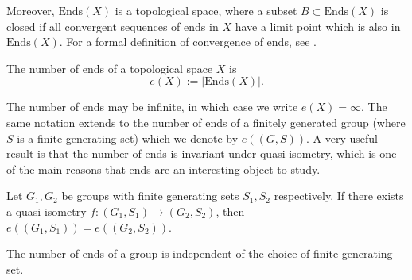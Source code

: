 \begin{remark}
    Moreover, \(\mathrm{Ends}(X)\) is a topological space, where a subset \(B \subset \mathrm{Ends}(X)\) is closed if all convergent sequences of ends in \(X\) have a limit point which is also in \(\mathrm{Ends}(X)\). For a formal definition of convergence of ends, see \cite[p.~144]{bridson_haefliger_metric_1999}.
\end{remark}

\begin{definition}
    The number of ends of a topological space \(X\) is 
    \[
        e(X) := |\mathrm{Ends}(X)|.
    \]
\end{definition}

The number of ends may be infinite, in which case we write \(e(X) = \infty\). The same notation extends to the number of ends of a finitely generated group (where \(S\) is a finite generating set) which we denote by \(e((G,S))\). A very useful result is that the number of ends is invariant under quasi-isometry, which is one of the main reasons that ends are an interesting object to study. 

\begin{theorem} \cite[p.~145]{bridson_haefliger_metric_1999}
    Let \(G_1,G_2\) be groups with finite generating sets \(S_1,S_2\) respectively. If there exists a quasi-isometry \(f: (G_1, S_1) \to (G_2,S_2)\), then \(e((G_1,S_1)) = e((G_2,S_2))\).
\end{theorem}

\begin{corollary}
    The number of ends of a group is independent of the choice of finite generating set.
\end{corollary}

